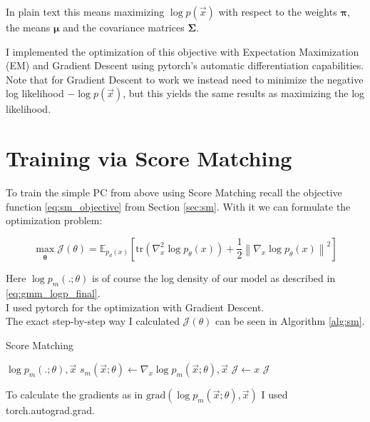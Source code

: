 In plain text this means maximizing $\log p(\vec x)$ with respect to the weights $\boldsymbol \pi$, the means $\boldsymbol \mu$ and the covariance matrices $\boldsymbol \Sigma$.

I implemented the optimization of this objective with Expectation Maximization (EM) and Gradient Descent using pytorch's 
automatic differentiation capabilities. 
Note that for Gradient Descent to work we instead need to minimize the negative log likelihood $- \log p(\vec x)$, 
but this yields the same results as maximizing the log likelihood.

\section{Training via Score Matching}
\label{sec:gmm_score_matching}

To train the simple PC from above using Score Matching recall 
the objective function \ref{eq:sm_objective} from Section \ref{sec:sm}. 
With it we can formulate the optimization problem: 

\begin{equation}
    \max_{\substack{\boldsymbol \theta}} \mathcal{J}(\theta) = \mathbb{E}_{p_d(x)} \left[\text{tr} \left( \nabla_x^2 \log p_\theta(x) \right) + \frac{1}{2} \left\| \nabla_x \log p_\theta(x) \right\|^2 \right]
    \label{eq:sm_optimization_problem}
\end{equation}

Here $\log p_m(.;\theta)$ is of course the log density of our model as described in \ref{eq:gmm_logp_final}. \\
I used pytorch for the optimization with Gradient Descent. \\

The exact step-by-step way I calculated $\mathcal{J}(\theta)$ can be seen in Algorithm \ref{alg:sm}.

\begin{algorithm}
    \caption{Score Matching}
    \label{alg:sm}
    \begin{algorithmic}[1]  
        \Require $\log p_m(.;\theta), \vec x$
        \State $s_m(\vec x; \theta) \gets \nabla_x \log p_m(\vec x;\theta), \vec x$
        \State $\mathcal{J} \gets x$
        \State \Return $\mathcal{J}$
    \end{algorithmic}
\end{algorithm}


To calculate the gradients as in $\text{grad}(\log p_m(\vec x;\theta), \vec x)$ I used torch.autograd.grad. 


